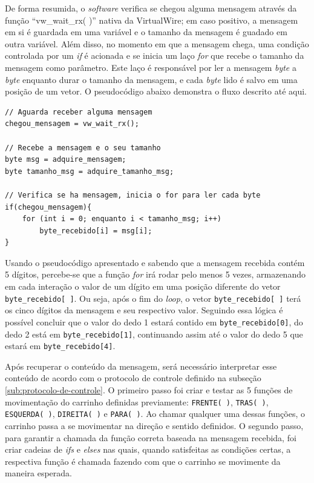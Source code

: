 \documentclass[
	12pt,				%
	openright,			%
	oneside,			%
	a4paper,			%
	english,			%
	brazil				%
	]{abntex2}
\begin{document}
		De forma resumida, o \textit{software} verifica se chegou alguma mensagem através da função ``vw\_wait\_rx( )'' nativa da VirtualWire; em caso positivo, a mensagem em si é guardada em uma variável e o tamanho da mensagem é guadado em outra variável. Além disso, no momento em que a mensagem chega, uma condição controlada por um \textit{if} é acionada e se inicia um laço \textit{for} que recebe o tamanho da mensagem como parâmetro. Este laço é responsável por ler a mensagem \textit{byte} a \textit{byte} enquanto durar o tamanho da mensagem, e cada \textit{byte} lido é salvo em uma posição de um vetor. O pseudocódigo abaixo demonstra o fluxo descrito até aqui.
\begin{lstlisting}
// Aguarda receber alguma mensagem
chegou_mensagem = vw_wait_rx();

// Recebe a mensagem e o seu tamanho
byte msg = adquire_mensagem;
byte tamanho_msg = adquire_tamanho_msg;
	
// Verifica se ha mensagem, inicia o for para ler cada byte
if(chegou_mensagem){
	for (int i = 0; enquanto i < tamanho_msg; i++)
		byte_recebido[i] = msg[i];		
}
\end{lstlisting}

		Usando o pseudocódigo apresentado e sabendo que a mensagem recebida contém 5 dígitos, percebe-se que a função \textit{for} irá rodar pelo menos 5 vezes, armazenando em cada interação o valor de um dígito em uma posição diferente do vetor \texttt{byte\_recebido[ ]}. Ou seja, após o fim do \textit{loop}, o vetor \texttt{byte\_recebido[ ]} terá os cinco dígitos da mensagem e seu respectivo valor. Seguindo essa lógica é possível concluir que o valor do dedo 1 estará contido em \texttt{byte\_recebido[0]}, do dedo 2 está em \texttt{byte\_recebido[1]}, continuando assim até o valor do dedo 5 que estará em \texttt{byte\_recebido[4]}.
		
		Após recuperar o conteúdo da mensagem, será necessário interpretar esse conteúdo de acordo com o protocolo de controle definido na subseção \ref{sub:protocolo-de-controle}. O primeiro passo foi criar e testar as 5 funções de movimentação do carrinho definidas previamente: \texttt{FRENTE( )}, \texttt{TRAS( )}, \texttt{ESQUERDA( )}, \texttt{DIREITA( )} e \texttt{PARA( )}. Ao chamar qualquer uma dessas funções, o carrinho passa a se movimentar na direção e sentido definidos. O segundo passo, para garantir a chamada da função correta baseada na mensagem recebida, foi criar cadeias de \textit{ifs} e \textit{elses} nas quais, quando satisfeitas as condições certas, a respectiva função é chamada fazendo com que o carrinho se movimente da maneira esperada. 
		
\end{document}
